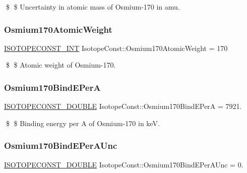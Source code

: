 \$ \$ Uncertainty in atomic mass of Osmium-\/170 in amu. \mbox{\label{group___isotope_const-_osmium-_os170_ga871d6579ee892a53a9f790ef6c6281ce}} 
\subsubsection{\texorpdfstring{Osmium170\+Atomic\+Weight}{Osmium170AtomicWeight}}
{\footnotesize\ttfamily \mbox{\hyperlink{group___isotope_const-_macros_ga5f18360b3e99483a35c32d789e62621c}{I\+S\+O\+T\+O\+P\+E\+C\+O\+N\+S\+T\+\_\+\+I\+NT}} Isotope\+Const\+::\+Osmium170\+Atomic\+Weight = 170}

\$ \$ Atomic weight of Osmium-\/170. \mbox{\label{group___isotope_const-_osmium-_os170_ga3de6e070df17b184d012d9740da577e1}} 
\subsubsection{\texorpdfstring{Osmium170\+Bind\+E\+PerA}{Osmium170BindEPerA}}
{\footnotesize\ttfamily \mbox{\hyperlink{group___isotope_const-_macros_ga8f45a7272ce02c0b4c65c44636ed719a}{I\+S\+O\+T\+O\+P\+E\+C\+O\+N\+S\+T\+\_\+\+D\+O\+U\+B\+LE}} Isotope\+Const\+::\+Osmium170\+Bind\+E\+PerA = 7921.}

\$ \$ Binding energy per A of Osmium-\/170 in keV. \mbox{\label{group___isotope_const-_osmium-_os170_ga194c380732e0d9d03ac9dc2094c68761}} 
\subsubsection{\texorpdfstring{Osmium170\+Bind\+E\+Per\+A\+Unc}{Osmium170BindEPerAUnc}}
{\footnotesize\ttfamily \mbox{\hyperlink{group___isotope_const-_macros_ga8f45a7272ce02c0b4c65c44636ed719a}{I\+S\+O\+T\+O\+P\+E\+C\+O\+N\+S\+T\+\_\+\+D\+O\+U\+B\+LE}} Isotope\+Const\+::\+Osmium170\+Bind\+E\+Per\+A\+Unc = 0.}

